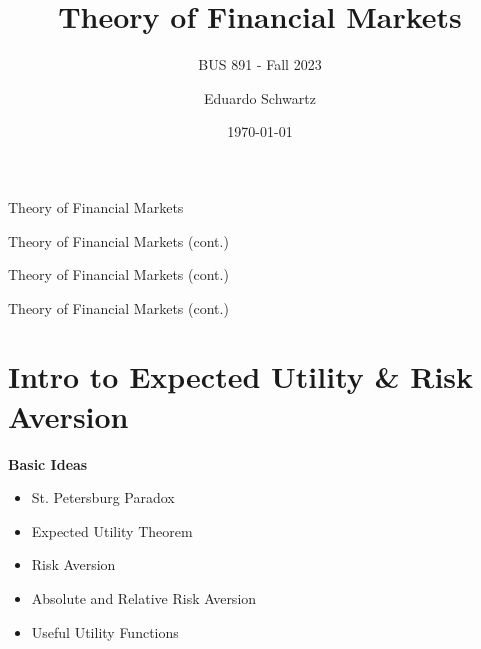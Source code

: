 \documentclass[
14pt,notheorems,hyperref={pdfauthor=whatever}
]{beamer}
\title[
]{Theory of Financial Markets}
\subtitle{BUS 891 - Fall 2023}
\author[
]{
    Eduardo Schwartz 
}
\institute{
    Ryan Beedie Chair in Finance, \\
    Simon Fraser University}
\date{\today}
\begin{document}
{
\begin{frame}
  \titlepage
\end{frame}
}
\addtocounter{framenumber}{-1}

\begin{frame}{Theory of Financial Markets}
    \setcounter{tocdepth}{2}
        \tableofcontents[sections={1-3}]
\end{frame}
\begin{frame}{Theory of Financial Markets (cont.)}
    \setcounter{tocdepth}{2}
        \tableofcontents[sections={4-9}]
\end{frame}
\begin{frame}{Theory of Financial Markets (cont.)}
    \setcounter{tocdepth}{2}
        \tableofcontents[sections={10-14}]
\end{frame}
\begin{frame}{Theory of Financial Markets (cont.)}
    \setcounter{tocdepth}{2}
        \tableofcontents[sections={15-20}]
        \vspace{166px}
\end{frame}

\section{Intro to Expected Utility \& Risk Aversion}
\begin{frame}
\alert{\textbf{Basic Ideas}}
\begin{itemize}
    \item St. Petersburg Paradox
    \item Expected Utility Theorem
    \item Risk Aversion
    \item Absolute and Relative Risk Aversion
    \item Useful Utility Functions
\end{itemize} 
\end{frame}
\end{document}
